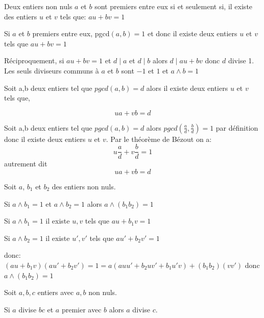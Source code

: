\documentclass[french]{book}
\begin{document}
\begin{thm}

Deux entiers non nuls $a$ et $b$ sont premiers entre eux si et seulement si, il existe des entiers $u$ et $v$ tels que: $au+bv=1$
\end{thm}

\begin{demo}

Si $a$ et $b$ premiers entre eux, pgcd$(a,b)=1$ et donc il existe deux entiers $u$ et $v$ tels que $au+bv=1$

Réciproquement, si $au+bv=1$ et $d\mid a$ et $d\mid b$ alors $d\mid au+bv$ donc $d$ divise 1. Les seuls diviseurs communs à $a$ et $b$ sont $-1$ et $1$ et $a \wedge b=1$

\end{demo}

\begin{cor}
Soit a,b deux entiers tel que $pgcd(a,b)=d$ alors il existe deux entiers $u$ et $v$ tels que,

 $$ua+vb=d$$
\end{cor}

\begin{demo}
Soit a,b deux entiers tel que $pgcd(a,b)=d$ alors $pgcd(\frac{a}{d},\frac{b}{d})=1$ par définition donc il existe deux entiers $u$ et $v$. Par le théorème de Bézout on a:
 $$u\dfrac{a}{d}+v\dfrac{b}{d}=1$$
 autrement dit 
 $$ua+vb=d$$

\end{demo}

\begin{thm}

Soit $a$, $b_{1}$ et $b_{2}$ des entiers non nuls.

Si $a\wedge b_{1}=1$ et $a\wedge b_{2}=1$ alors $a\wedge (b_{1}b_{2})=1$  
\end{thm}

\begin{demo}

Si $a\wedge b_{1}=1$ il existe $u,v$ tels que $au+b_{1}v=1$

Si $a\wedge b_{2}=1$ il existe $u',v'$ tels que $au'+b_{2}v'=1$

donc: $(au+b_{1}v)(au'+b_{2}v')=1=a(auu'+b_{2}uv'+b_{1}u'v)+(b_{1}b_{2})(vv')$ donc $a\wedge (b_{1}b_{2})=1$  


\end{demo}

\begin{thm}

Soit $a,b,c$ entiers avec $a, b$ non nuls.

Si $a$ divise $bc$ et $a$ premier avec $b$ alors $a$ divise $c$.

\end{thm}
\end{document}
